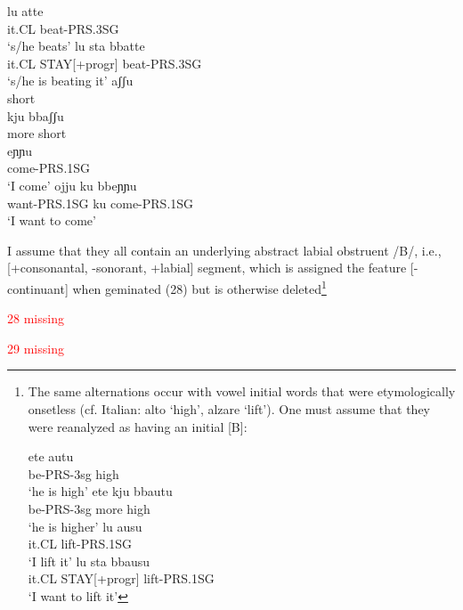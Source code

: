 \documentclass[output=paper,colorlinks,citecolor=brown,
]{langscibook}
\begin{document}
\ea
    \ea
        \ea \gll lu atte\\
            it.CL beat-PRS.3SG\\  
            \glt `s/he beats'  
        \ex \gll lu   sta     bbatte\\
            it.CL STAY[+progr] beat-PRS.3SG\\
            \glt `s/he is beating it'
        \z
    \ex
        \ea \gll aʃʃu\\
                short\\
        \ex \gll kju     bbaʃʃu\\
                more    short\\
        \z
    \ex
        \ea \gll eɲɲu\\
            come-PRS.1SG\\ 
            \glt `I come'   
        \ex \gll ojju      ku   bbeɲɲu\\
            want-PRS.1SG ku   come-PRS.1SG\\
            \glt `I want to come' 
        \z
    \z
\z

I assume that they all contain an underlying abstract labial obstruent /B/, i.e., [+consonantal, -sonorant, +labial] segment, which is assigned the feature [-continuant] when geminated (28) but is otherwise deleted\footnote{The same alternations occur with vowel initial words that were etymologically onsetless (cf. Italian: alto `high', alzare `lift').  One must assume that they were reanalyzed as having an initial [B]:

\ea
    \ea
        \ea \gll ete autu\\
            be-PRS-3sg high\\
            \glt ‘he is high’    
        \ex \gll ete kju bbautu\\
            be-PRS-3sg more high\\
            \glt ‘he is higher’
        \z
    \ex
        \ea \gll lu ausu\\
            it.CL lift-PRS.1SG\\
            \glt ‘I lift it’  
        \ex \gll lu sta bbausu\\
            it.CL STAY[+progr]  lift-PRS.1SG\\
            \glt ‘I want to lift it’
        \z
    \z
\z

}

\ea \textcolor{red}{28 missing}
\z

\ea \textcolor{red}{29 missing}
\z
\end{document}
